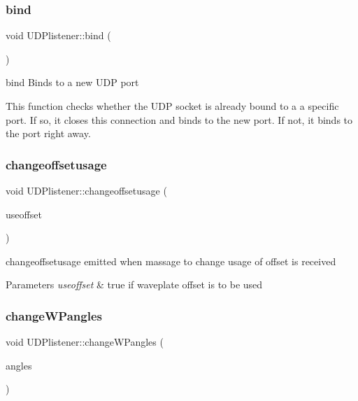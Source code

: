 \subsubsection{\texorpdfstring{bind}{bind}}
{\footnotesize\ttfamily void U\+D\+Plistener\+::bind (\begin{DoxyParamCaption}{ }\end{DoxyParamCaption})\hspace{0.3cm}{\ttfamily [slot]}}



bind Binds to a new U\+DP port 

This function checks whether the U\+DP socket is already bound to a a specific port. If so, it closes this connection and binds to the new port. If not, it binds to the port right away. \mbox{\label{classUDPlistener_abc9c9ae6f1371e6b55d9631ba00743c3}} 
\subsubsection{\texorpdfstring{changeoffsetusage}{changeoffsetusage}}
{\footnotesize\ttfamily void U\+D\+Plistener\+::changeoffsetusage (\begin{DoxyParamCaption}\item[{bool}]{useoffset }\end{DoxyParamCaption})\hspace{0.3cm}{\ttfamily [signal]}}



changeoffsetusage emitted when massage to change usage of offset is received 


\begin{DoxyParams}{Parameters}
{\em useoffset} & true if waveplate offset is to be used \\
\hline
\end{DoxyParams}
\mbox{\label{classUDPlistener_a6b7ee954a2af1aa98c6963f6ae266bc3}} 
\subsubsection{\texorpdfstring{change\+W\+Pangles}{changeWPangles}}
{\footnotesize\ttfamily void U\+D\+Plistener\+::change\+W\+Pangles (\begin{DoxyParamCaption}\item[{Q\+Vector$<$ double $>$}]{angles }\end{DoxyParamCaption})\hspace{0.3cm}{\ttfamily [signal]}}



